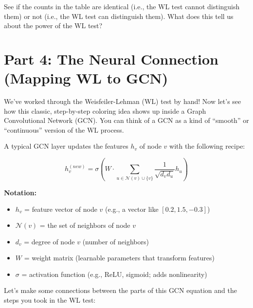 \documentclass[a4paper, 12pt]{extarticle}
\begin{document}
See if the counts in the table are identical (i.e., the WL test cannot distinguish them) or not (i.e., the WL test can distinguish them). What does this tell us about the power of the WL test?

\clearpage

\section*{Part 4: The Neural Connection (Mapping WL to GCN)}

We've worked through the Weisfeiler-Lehman (WL) test by hand! Now let's see how this classic, step-by-step coloring idea shows up inside a Graph Convolutional Network (GCN). You can think of a GCN as a kind of ``smooth'' or ``continuous'' version of the WL process.

A typical GCN layer updates the features $h_v$ of node $v$ with the following recipe:

\[
h_v^{(new)} = \sigma \left( W \cdot \sum_{u \in \mathcal{N}(v) \cup \{v\}} \frac{1}{\sqrt{d_v d_u}} h_u \right)
\]

\textbf{Notation:}
\begin{itemize}
    \item $h_v$ = feature vector of node $v$ (e.g., a vector like $[0.2, 1.5, -0.3]$)
    \item $\mathcal{N}(v)$ = the set of neighbors of node $v$
    \item $d_v$ = degree of node $v$ (number of neighbors)
    \item $W$ = weight matrix (learnable parameters that transform features)
    \item $\sigma$ = activation function (e.g., ReLU, sigmoid; adds nonlinearity)
\end{itemize}

\vspace{0.3cm}

Let's make some connections between the parts of this GCN equation and the steps you took in the WL test:
\end{document}
